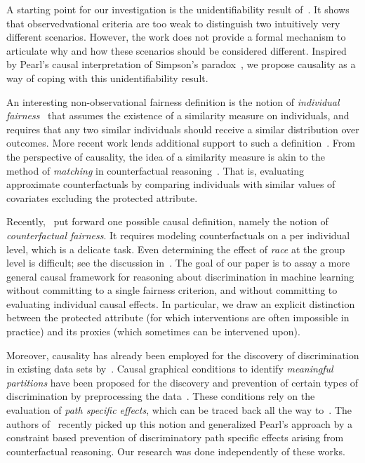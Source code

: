 A starting point for our investigation is the unidentifiability result
of~\cite{Hardt2016}. It shows that observedvational criteria are too weak to
distinguish two intuitively very different scenarios. However, the work does not
provide a formal mechanism to articulate why and how these scenarios should be
considered different. Inspired by Pearl's causal interpretation of Simpson's
paradox~\cite[Section 6]{Pearl2009}, we propose causality as a way of coping
with this unidentifiability result.

An interesting non-observational fairness definition is the notion of
\emph{individual fairness}~\cite{Dwork2012} that assumes the existence of a
similarity measure on individuals, and requires that any two similar individuals
should receive a similar distribution over outcomes. More recent work lends
additional support to such a definition~\cite{Friedler2016}. From the
perspective of causality, the idea of a similarity measure is akin to the method
of \emph{matching} in counterfactual reasoning~\cite{Rosenbaum1983,
Qureshi2016}. That is, evaluating approximate counterfactuals by comparing
individuals with similar values of covariates excluding the protected attribute.

Recently,~\cite{Kusner2017} put forward one possible causal definition, namely
the notion of \emph{counterfactual fairness}. It requires modeling
counterfactuals on a per individual level, which is a delicate task. Even
determining the effect of \emph{race} at the group level is difficult; see the
discussion in~\cite{VanderWeele2014}. The goal of our paper is to assay a more
general causal framework for reasoning about discrimination in machine learning
without committing to a single fairness criterion, and without committing to
evaluating individual causal effects. In particular, we draw an explicit
distinction between the protected attribute (for which interventions are often
impossible in practice) and its proxies (which sometimes can be intervened
upon).

Moreover, causality has already been employed for the discovery of
discrimination in existing data sets by~\cite{Bonchi2015, Qureshi2016}. Causal
graphical conditions to identify \emph{meaningful partitions} have been proposed
for the discovery and prevention of certain types of discrimination by
preprocessing the data~\cite{Zhang2017b}. These conditions rely on the
evaluation of \emph{path specific effects}, which can be traced back all the way
to~\cite[Section 4.5.3]{Pearl2009}. The authors of~\cite{Nabi2017} recently
picked up this notion and generalized Pearl's approach by a constraint based
prevention of discriminatory path specific effects arising from counterfactual
reasoning. Our research was done independently of these works.

